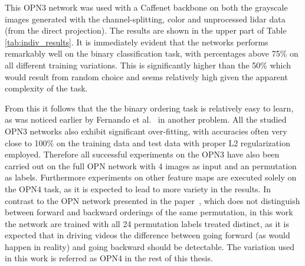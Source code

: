 This OPN3 network was used with a Caffenet backbone on both the grayscale images generated with the channel-splitting, color and unprocessed lidar data (from the direct projection). The results are shown in the upper part of Table \ref{tab:indiv_results}. It is immediately evident that the networks performs remarkably well on the binary classification task, with percentages above 75\% on all different training variations. This is significantly higher than the 50\% which would result from random choice and seems relatively high given the apparent complexity of the task. 


From this it follows that the the binary ordering task is relatively easy to learn, as was noticed earlier by Fernando et al.~\cite{fernando2017} in another problem. All the studied OPN3 networks also exhibit significant over-fitting, with accuracies often very close to 100\% on the training data and test data with proper L2 regularization employed. Therefore all successful experiments on the OPN3 have also been carried out on the full OPN network with 4 images as input and an permutation as labels. Furthermore experiments on other feature maps are executed solely on the OPN4 task, as it is expected to lead to more variety in the results. In contrast to the OPN network presented in the paper~\cite{lee2017}, which does not distinguish between forward and backward orderings of the same permutation, in this work the network are trained with all 24 permutation labels treated distinct, as it is expected that in driving videos the difference between going forward (as would happen in reality) and going backward should be detectable. The variation used in this work is referred as OPN4 in the rest of this thesis.

